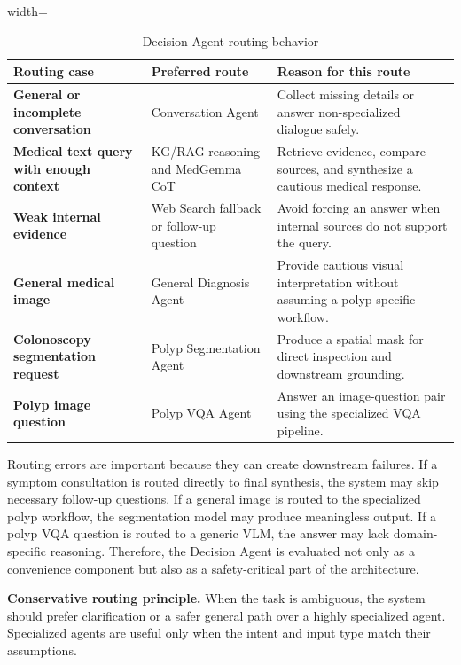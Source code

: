 \begin{table}[H]
\centering
\begin{adjustbox}{width=\textwidth}
\begin{tabular}{>{\RaggedRight\arraybackslash}p{} >{\RaggedRight\arraybackslash}p{} >{\RaggedRight\arraybackslash}p{}}
\hline\hline
\textbf{Routing case} & \textbf{Preferred route} & \textbf{Reason for this route} \\
\hline
\textbf{General or incomplete conversation} & Conversation Agent & Collect missing details or answer non-specialized dialogue safely. \\
\textbf{Medical text query with enough context} & KG/RAG reasoning and MedGemma CoT & Retrieve evidence, compare sources, and synthesize a cautious medical response. \\
\textbf{Weak internal evidence} & Web Search fallback or follow-up question & Avoid forcing an answer when internal sources do not support the query. \\
\textbf{General medical image} & General Diagnosis Agent & Provide cautious visual interpretation without assuming a polyp-specific workflow. \\
\textbf{Colonoscopy segmentation request} & Polyp Segmentation Agent & Produce a spatial mask for direct inspection and downstream grounding. \\
\textbf{Polyp image question} & Polyp VQA Agent & Answer an image-question pair using the specialized VQA pipeline. \\
\hline\hline
\end{tabular}
\end{adjustbox}
\caption{Decision Agent routing behavior}
\label{table:decision-agent-routing}
\end{table}

Routing errors are important because they can create downstream failures. If a symptom consultation is routed directly to final synthesis, the system may skip necessary follow-up questions. If a general image is routed to the specialized polyp workflow, the segmentation model may produce meaningless output. If a polyp VQA question is routed to a generic VLM, the answer may lack domain-specific reasoning. Therefore, the Decision Agent is evaluated not only as a convenience component but also as a safety-critical part of the architecture.

\textbf{Conservative routing principle.} When the task is ambiguous, the system should prefer clarification or a safer general path over a highly specialized agent. Specialized agents are useful only when the intent and input type match their assumptions.


